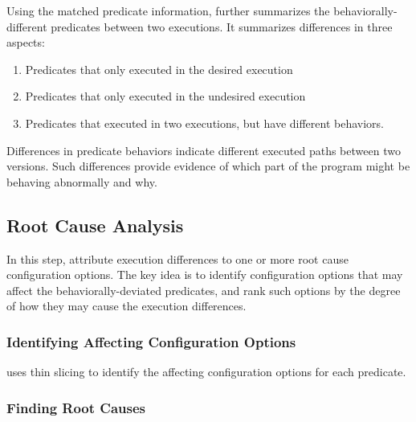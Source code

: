 Using the matched predicate information, \ourtool further
summarizes the behaviorally-different predicates between
two executions. It summarizes differences in three aspects:

\begin{enumerate}
\item Predicates that only executed in the desired execution
\item Predicates that only executed in the undesired execution
\item Predicates that executed in two executions, but have
different behaviors. 
\end{enumerate}

Differences in predicate behaviors indicate different executed paths
between two versions. Such differences provide evidence of
which part of the program might be behaving abnormally and why.



\subsection{Root Cause Analysis}
\label{sec:rootcause}


In this step, \ourtool attribute execution differences
to one or more root cause configuration options.
The key idea is to identify configuration options that
may affect the behaviorally-deviated predicates, and rank
such options by the degree of how they may cause
the execution differences.

\subsubsection{Identifying Affecting Configuration Options}

\ourtool uses thin slicing to identify the affecting
configuration options for each predicate.



\subsubsection{Finding Root Causes}

